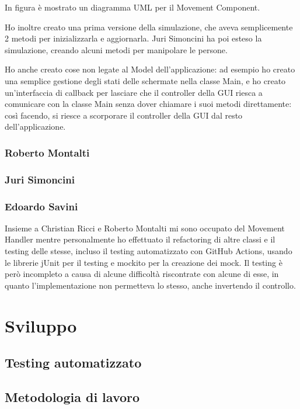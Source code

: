 In figura è mostrato un diagramma UML per il Movement Component.

Ho inoltre creato una prima versione della simulazione, che aveva semplicemente 2 metodi per inizializzarla e aggiornarla. Juri Simoncini ha poi esteso la simulazione, creando alcuni metodi per manipolare le persone.

Ho anche creato cose non legate al Model dell'applicazione: ad esempio ho creato una semplice gestione degli stati delle schermate nella classe Main, e ho creato un'interfaccia di callback per lasciare che il controller della GUI riesca a comunicare con la classe Main senza dover chiamare i suoi metodi direttamente: così facendo, si riesce a scorporare il controller della GUI dal resto dell'applicazione.

\subsection{Roberto Montalti}

\subsection{Juri Simoncini}

\subsection{Edoardo Savini}
Insieme a Christian Ricci e Roberto Montalti mi sono occupato del Movement Handler mentre personalmente ho effettuato il refactoring di altre classi e il testing delle stesse, incluso il testing automatizzato con GitHub Actions, usando le librerie jUnit per il testing e mockito per la creazione dei mock. Il testing è però incompleto a causa di alcune difficoltà riscontrate con alcune di esse, in quanto l'implementazione non permetteva lo stesso, anche invertendo il controllo.

\chapter{Sviluppo}

\section{Testing automatizzato}


\section{Metodologia di lavoro}


